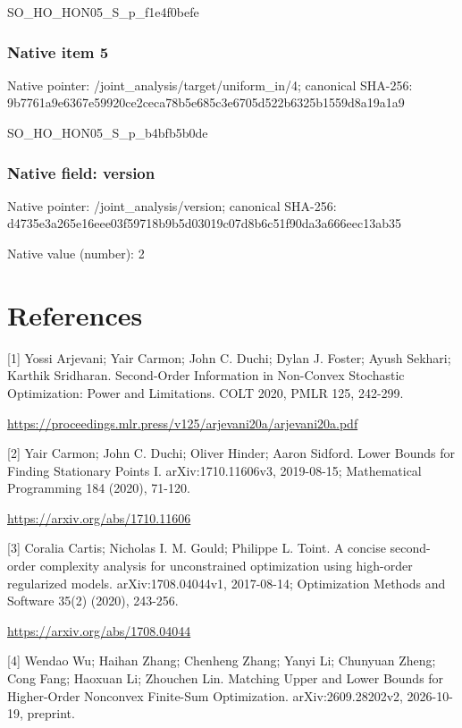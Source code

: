 \documentclass[10pt,a4paper]{article}
\begin{document}
\begingroup\raggedright\sloppy SO\_\allowbreak{}HO\_\allowbreak{}HON05\_\allowbreak{}S\_\allowbreak{}p\_\allowbreak{}f1e4f0befe\par\endgroup

\subsubsection{Native item 5}
Native pointer: /joint\_\allowbreak{}analysis/target/uniform\_\allowbreak{}in/4; canonical SHA-256: 9b7761a9e6367e59920ce2ceca78b5e685c3e6705d522b6325b1559d8a19a1a9

\begingroup\raggedright\sloppy SO\_\allowbreak{}HO\_\allowbreak{}HON05\_\allowbreak{}S\_\allowbreak{}p\_\allowbreak{}b4bfb5b0de\par\endgroup

\subsubsection{Native field: version}
Native pointer: /joint\_\allowbreak{}analysis/version; canonical SHA-256: d4735e3a265e16eee03f59718b9b5d03019c07d8b6c51f90da3a666eec13ab35

Native value (number): 2

\section{References}
[1] Yossi Arjevani; Yair Carmon; John C. Duchi; Dylan J. Foster; Ayush Sekhari; Karthik Sridharan. Second-Order Information in Non-Convex Stochastic Optimization: Power and Limitations. COLT 2020, PMLR 125, 242-299.

\url{https://proceedings.mlr.press/v125/arjevani20a/arjevani20a.pdf}

[2] Yair Carmon; John C. Duchi; Oliver Hinder; Aaron Sidford. Lower Bounds for Finding Stationary Points I. arXiv:1710.11606v3, 2019-08-15; Mathematical Programming 184 (2020), 71-120.

\url{https://arxiv.org/abs/1710.11606}

[3] Coralia Cartis; Nicholas I. M. Gould; Philippe L. Toint. A concise second-order complexity analysis for unconstrained optimization using high-order regularized models. arXiv:1708.04044v1, 2017-08-14; Optimization Methods and Software 35(2) (2020), 243-256.

\url{https://arxiv.org/abs/1708.04044}

[4] Wendao Wu; Haihan Zhang; Chenheng Zhang; Yanyi Li; Chunyuan Zheng; Cong Fang; Haoxuan Li; Zhouchen Lin. Matching Upper and Lower Bounds for Higher-Order Nonconvex Finite-Sum Optimization. arXiv:2609.28202v2, 2026-10-19, preprint.
\end{document}
